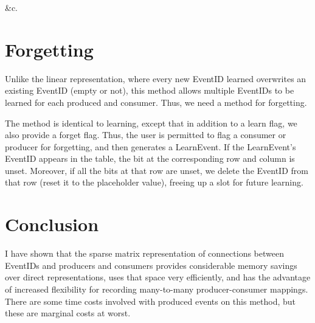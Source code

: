 \documentclass[11pt]{article}
\begin{document}
\&c.

\section{Forgetting}

Unlike the linear representation, where every new EventID learned overwrites an existing EventID (empty or not), this method allows multiple EventIDs to be learned for each produced and consumer. Thus, we need a method for forgetting.

The method is identical to learning, except that in addition to a learn flag, we also provide a forget flag. Thus, the user is permitted to flag a consumer or producer for forgetting, and then generates a LearnEvent. If the LearnEvent's EventID appears in the table, the bit at the corresponding row and column is unset. Moreover, if all the bits at that row are unset, we delete the EventID from that row (reset it to the placeholder value), freeing up a slot for future learning.

\section{Conclusion}

I have shown that the sparse matrix representation of connections between EventIDs and producers and consumers provides considerable memory savings over direct representations, uses that space very efficiently, and has the advantage of increased flexibility for recording many-to-many producer-consumer mappings. There are some time costs involved with produced events on this method, but these are marginal costs at worst.
\end{document}
